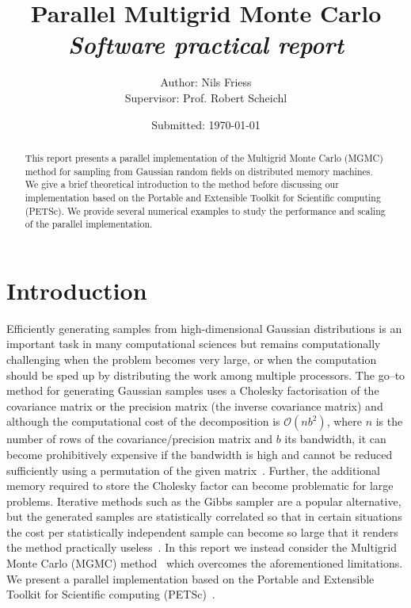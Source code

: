 \documentclass[
fontsize=11pt,
paper=a4,
numbers=noenddot
]{scrartcl}
\title{\vspace{-1cm}Parallel Multigrid Monte Carlo\\
{\normalsize\normalfont\emph{Software practical report}}}
\date{\small Submitted: \today}
\author{\normalsize Author: Nils Friess\\
\normalsize Supervisor: Prof. Robert Scheichl}
\begin{document}
\maketitle

\begin{abstract}
    This report presents a parallel implementation of the Multigrid Monte Carlo (MGMC) method for sampling from Gaussian random fields on distributed memory machines. We give a brief theoretical introduction to the method before discussing our implementation based on the Portable and Extensible Toolkit for Scientific computing (PETSc). We provide several numerical examples to study the performance and scaling of the parallel implementation.
\end{abstract}

\section{Introduction}
Efficiently generating samples from high-dimensional Gaussian distributions is an important task in many computational sciences but remains computationally challenging when the problem becomes very large, or when the computation should be sped up by distributing the work among multiple processors. The go--to method for generating Gaussian samples uses a Cholesky factorisation of the covariance matrix or the precision matrix (the inverse covariance matrix) and although the computational cost of the decomposition is $\mathcal{O}(nb^2)$, where $n$ is the number of rows of the covariance/precision matrix and $b$ its bandwidth, it can become prohibitively expensive if the bandwidth is high and cannot be reduced sufficiently using a permutation of the given matrix~\cite{golubvanloan,rue2001fast,foxparker}. Further, the additional memory required to store the Cholesky factor can become problematic for large problems. Iterative methods such as the Gibbs sampler are a popular alternative, but the generated samples are statistically correlated so that in certain situations the cost per statistically independent sample can become so large that it renders the method practically useless~\cite{foxparker,kazashimuellerscheichl}. In this report we instead consider the Multigrid Monte Carlo (MGMC) method~\cite{goodmansokal} which overcomes the aforementioned limitations. We present a parallel implementation based on the Portable and Extensible Toolkit for Scientific computing (PETSc)~\cite{petsc-web-page,petsc-user-ref}.
\end{document}
